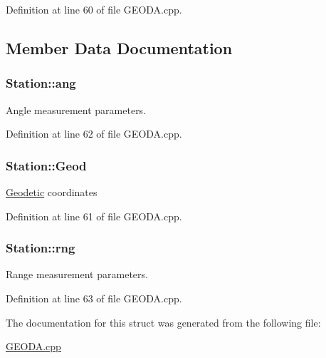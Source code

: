 Definition at line 60 of file G\-E\-O\-D\-A.\-cpp.



\subsection{Member Data Documentation}
\hypertarget{structStation_a378712bc67f1ca9fe2df21381892143f}{
\subsubsection[{ang}]{ Station\-::ang}}\label{structStation_a378712bc67f1ca9fe2df21381892143f}


Angle measurement parameters. 



Definition at line 62 of file G\-E\-O\-D\-A.\-cpp.

\hypertarget{structStation_a2c17c2bc76b0dbfb01d7305e160c5b6c}{
\subsubsection[{Geod}]{ Station\-::\-Geod}}\label{structStation_a2c17c2bc76b0dbfb01d7305e160c5b6c}
\hyperlink{classGeodetic}{Geodetic} coordinates 

Definition at line 61 of file G\-E\-O\-D\-A.\-cpp.

\hypertarget{structStation_a5a4dc5853a9776ddb69bed6b8bcab1a2}{
\subsubsection[{rng}]{ Station\-::rng}}\label{structStation_a5a4dc5853a9776ddb69bed6b8bcab1a2}


Range measurement parameters. 



Definition at line 63 of file G\-E\-O\-D\-A.\-cpp.



The documentation for this struct was generated from the following file\-:\begin{DoxyCompactItemize}
\item 
\hyperlink{GEODA_8cpp}{G\-E\-O\-D\-A.\-cpp}\end{DoxyCompactItemize}
